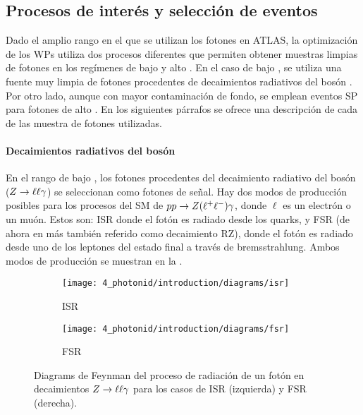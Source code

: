 \subsection{Procesos de inter\'es y selecci\'on de eventos}
\label{subsec:pid_ss:pid:event_selection}

Dado el amplio rango en el que se utilizan los fotones en \ac{ATLAS}, la optimización de los \acp{WP} utiliza dos procesos diferentes que permiten obtener muestras limpias de fotones en los regímenes de bajo y alto \pt. En el caso de bajo \pt, se utiliza una fuente muy limpia de fotones procedentes de decaimientos radiativos del bos\'on \Zboson. Por otro lado, aunque con mayor contaminación de fondo, se emplean eventos \acf{SP} para fotones de alto \pt. En los siguientes párrafos se ofrece una descripción de cada de las muestra de fotones utilizadas.


\paragraph{Decaimientos radiativos del bos\'on \Zboson}

En el rango de bajo \pt, los fotones procedentes del decaimiento radiativo del bosón \Zboson (\(Z \rightarrow \ell\ell \gamma\)) se seleccionan como fotones de señal. Hay dos modos de producción posibles para los procesos del \ac{SM} de \(pp\rightarrow Z(\ell^{+} \ell^{-})\gamma\), donde \(\ell\) es un electrón o un mu\'on. Estos son: \acf{ISR} donde el fotón es radiado desde los quarks, y \acf{FSR} (de ahora en m\'as también referido como decaimiento \acf{RZ}), donde el fotón es radiado desde uno de los leptones del estado final a través de bremsstrahlung. Ambos modos de producción se muestran en la \Fig{\ref{fig:pid_ss:event_selection:fsr_isr}}.

\begin{figure}[ht!]
    \centering
    \begin{subfigure}[h]{0.49\linewidth}
        \centering
        \texttt{[image: 4\_photonid/introduction/diagrams/isr]}
        \caption{\acf{ISR}}
    \end{subfigure}
    \hfill
    \begin{subfigure}[h]{0.49\linewidth}
        \centering
        \texttt{[image: 4\_photonid/introduction/diagrams/fsr]}
        \caption{\acf{FSR}}
    \end{subfigure}
    \caption{Diagrams de Feynman del proceso de radiaci\'on de un fot\'on en decaimientos \(Z\rightarrow\ell\ell\gamma\) para los casos de \ac{ISR} (izquierda) y \ac{FSR} (derecha).}
    \label{fig:pid_ss:event_selection:fsr_isr}
\end{figure}


